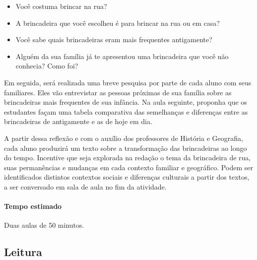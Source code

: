 \documentclass[11pt]{extarticle}
\begin{document}
\begin{itemize}

\item Você costuma brincar na rua?

\item A brincadeira que você escolheu é para brincar na rua ou em casa?

\item Você sabe quais brincadeiras eram mais frequentes antigamente?

\item Alguém da sua família já te apresentou uma brincadeira que você não conhecia? Como foi?

\end{itemize}


Em seguida, será realizada uma breve pesquisa por parte de cada aluno com seus familiares. Eles vão entrevistar as pessoas próximas de sua família sobre as brincadeiras mais frequentes de sua infância. Na aula seguinte, proponha que os estudantes façam uma tabela comparativa das semelhanças e diferenças entre as brincadeiras de antigamente e as de hoje em dia.


A partir dessa reflexão e com o auxílio dos professores de História e Geografia, cada aluno produzirá um texto sobre a transformação das brincadeiras ao longo do tempo. Incentive que seja explorada na redação o tema da brincadeira de rua, suas permanências e mudanças em cada contexto familiar e geográfico. Podem ser identificados distintos contextos sociais e diferenças culturais a partir dos textos, a ser conversado em sala de aula no fim da atividade.

\paragraph{Tempo estimado} Duas aulas de 50 minutos.

\subsection{Leitura}

\end{document}
